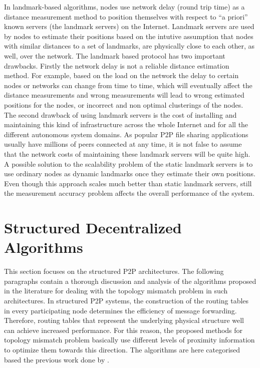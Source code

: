 \documentclass[acmcsur,acmnow]{acmtrans2m}
\begin{document}
In landmark-based algorithms, nodes use network delay (round trip
time) as a distance measurement method to position themselves with respect to ``a priori'' known servers (the landmark servers) on the Internet. Landmark servers are used by nodes to estimate their positions based on the intutive assumption that nodes with similar distances to a set of landmarks, are physically close to each other, as well, over the network. The landmark based protocol has two important drawbacks. Firstly the network delay is not a reliable distance estimation method. For example, based on the load on the network the delay to certain nodes or networks can change from time to time, which will eventually affect the distance measurements and wrong measurements will lead to wrong estimated positions for the nodes, or incorrect and non optimal clusterings of the nodes. The second drawback of using landmark servers is the cost of installing and maintaining this kind of infrastructure across the whole Internet and for all the different autonomous system domains. As popular P2P file sharing applications usually have millions of peers connected at any time, it is not false to assume that the network costs of maintaining these landmark servers will be quite high. A possible solution to the scalability problem of the static landmark servers is to use ordinary nodes as dynamic landmarks once they estimate their own positions. Even though this approach scales much better than static landmark servers, still the measurement accuracy problem affects the overall performance of the system.


\section{Structured Decentralized Algorithms}\label{sec:structured}

This section focuses on the structured P2P architectures. The following paragraphs contain a thorough discussion and analysis of the algorithms proposed in the literature for dealing with the topology mismatch problem in such architectures. In structured P2P systems, the construction of the routing tables in every participating node determines the efficiency of message forwarding. Therefore, routing tables that represent the underlying physical structure well can achieve increased performance. For this reason, the proposed methods for topology mismatch problem basically use different levels of proximity information to optimize them towards this direction. The algorithms are here categorised based the previous work done by \cite{castro_proximitydht_2002,castro_topawareroute_2002,ratnasamy_openq_2002}.
\end{document}
